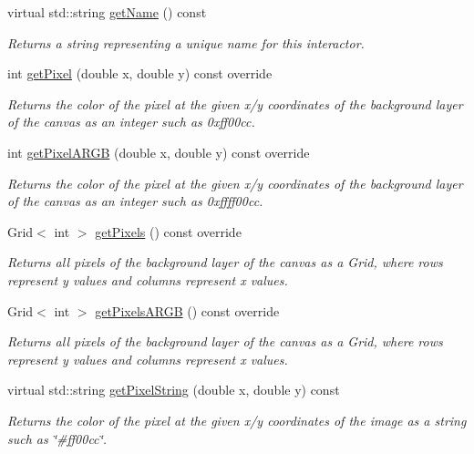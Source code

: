 \begin{DoxyCompactItemize}
virtual std\+::string \mbox{\hyperlink{classGInteractor_a8a60438a5b55d0b2ceb35c8674b9d8c5}{get\+Name}} () const
\begin{DoxyCompactList}\small\item\em Returns a string representing a unique name for this interactor. \end{DoxyCompactList}\item 
int \mbox{\hyperlink{classGCanvas_a342aaa6de62a4a324a2e4f3921db1d3e}{get\+Pixel}} (double x, double y) const override
\begin{DoxyCompactList}\small\item\em Returns the color of the pixel at the given x/y coordinates of the background layer of the canvas as an integer such as 0xff00cc. \end{DoxyCompactList}\item 
int \mbox{\hyperlink{classGCanvas_ae28117ec01d58208d381fba886030850}{get\+Pixel\+A\+R\+GB}} (double x, double y) const override
\begin{DoxyCompactList}\small\item\em Returns the color of the pixel at the given x/y coordinates of the background layer of the canvas as an integer such as 0xffff00cc. \end{DoxyCompactList}\item 
Grid$<$ int $>$ \mbox{\hyperlink{classGCanvas_aec81bf7947e993d8df8039e19dbac533}{get\+Pixels}} () const override
\begin{DoxyCompactList}\small\item\em Returns all pixels of the background layer of the canvas as a Grid, where rows represent y values and columns represent x values. \end{DoxyCompactList}\item 
Grid$<$ int $>$ \mbox{\hyperlink{classGCanvas_aa1626b73d6dae452e9e78c159411058b}{get\+Pixels\+A\+R\+GB}} () const override
\begin{DoxyCompactList}\small\item\em Returns all pixels of the background layer of the canvas as a Grid, where rows represent y values and columns represent x values. \end{DoxyCompactList}\item 
virtual std\+::string \mbox{\hyperlink{classGDrawingSurface_a8da04ef488ec5fa498fbbffaf50928fd}{get\+Pixel\+String}} (double x, double y) const
\begin{DoxyCompactList}\small\item\em Returns the color of the pixel at the given x/y coordinates of the image as a string such as \char`\"{}\#ff00cc\char`\"{}. \end{DoxyCompactList}\item 

\end{DoxyCompactItemize}
